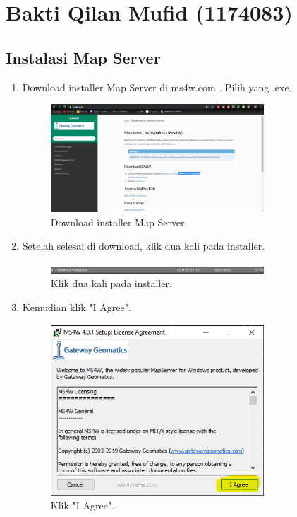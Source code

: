 \section{Bakti Qilan Mufid (1174083)}
\subsection{Instalasi Map Server}
\begin{enumerate}
	\item  Download installer Map Server di ms4w.com . Pilih yang .exe.
	\hfill\break
	\begin{figure}[H]
		\includegraphics[width=8cm]{figures/Tugas4/1174083/pic1.png}
		\centering
		\caption{Download installer Map Server.}
	\end{figure}
	\item  Setelah selesai di download, klik dua kali pada installer.
	\hfill\break
	\begin{figure}[H]
		\includegraphics[width=8cm]{figures/Tugas4/1174083/pic2.png}
		\centering
		\caption{Klik dua kali pada installer.}
	\end{figure}
	\item  Kemudian klik "I Agree".
	\hfill\break
	\begin{figure}[H]
		\includegraphics[width=8cm]{figures/Tugas4/1174083/pic3.png}
		\centering
		\caption{Klik "I Agree".}
	\end{figure}

\end{enumerate}
